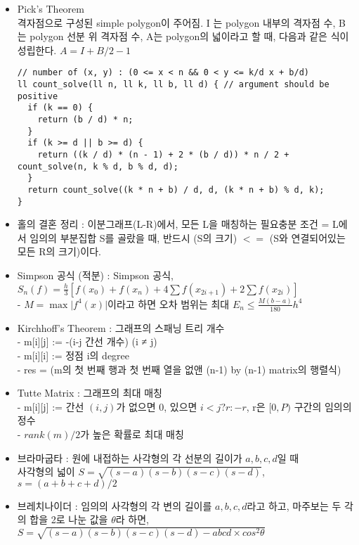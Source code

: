 \documentclass[landscape, 8pt, a4paper, oneside, twocolumn]{extarticle}
\begin{document}
\begin{itemize}
\item Pick’s Theorem\\
격자점으로 구성된 simple polygon이 주어짐. I 는 polygon 내부의 격자점 수, B 는 polygon 선분 위 격자점 수, A는 polygon의 넓이라고 할 때, 다음과 같은 식이 성립한다. $A=I+B/2-1$
\begin{verbatim}
// number of (x, y) : (0 <= x < n && 0 < y <= k/d x + b/d)
ll count_solve(ll n, ll k, ll b, ll d) { // argument should be positive
  if (k == 0) {
    return (b / d) * n;
  }
  if (k >= d || b >= d) {
    return ((k / d) * (n - 1) + 2 * (b / d)) * n / 2 + count_solve(n, k % d, b % d, d);
  }
  return count_solve((k * n + b) / d, d, (k * n + b) % d, k);
}
\end{verbatim}

\item 홀의 결혼 정리 : 이분그래프(L-R)에서, 모든 L을 매칭하는 필요충분 조건 = L에서 임의의 부분집합 S를 골랐을 때, 반드시 (S의 크기) $<=$ (S와 연결되어있는 모든 R의 크기)이다.

\item Simpson 공식 (적분) : Simpson 공식, $S_n(f) = \frac{h}{3}[f(x_0)+f(x_n)+ 4\sum f(x_{2i+1}) + 2\sum f(x_{2i})]$\\
- $M = \max \vert f^4(x) \vert$이라고 하면 오차 범위는 최대 $E_n \leq \frac{M(b-a)}{180}h^4$

\item Kirchhoff’s Theorem : 그래프의 스패닝 트리 개수\\
- m[i][j] :=  -(i-j 간선 개수) (i ≠ j)\\
- m[i][i] :=  정점 i의 degree\\
- res =  (m의 첫 번째 행과 첫 번째 열을 없앤 (n-1) by (n-1) matrix의 행렬식)

\item Tutte Matrix : 그래프의 최대 매칭\\
- m[i][j] := 간선 $(i, j)$가 없으면 0, 있으면 $i < j ? r : -r$, r은 $[0,P)$ 구간의 임의의 정수\\
- $rank(m) / 2$가 높은 확률로 최대 매칭

\item 브라마굽타 : 원에 내접하는 사각형의 각 선분의 길이가 $a, b, c, d$일 때\\
사각형의 넓이 $S=\sqrt{(s-a)(s-b)(s-c)(s-d)}$, $s=(a+b+c+d)/2$

\item 브레치나이더 : 임의의 사각형의 각 변의 길이를 $a,b,c,d$라고 하고, 마주보는 두 각의 합을 2로 나눈 값을 $\theta$라 하면, $S=\sqrt{(s-a)(s-b)(s-c)(s-d)-abcd\times cos^2 \theta}$


\end{itemize}
\end{document}
